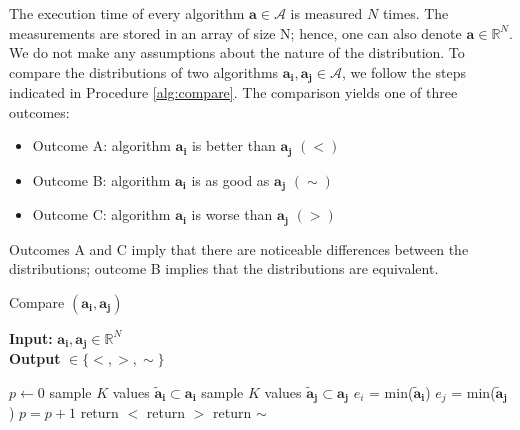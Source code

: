 \documentclass[conference]{IEEEtran}
\newcommand{\p}[1]{{\color{blue} Pdj: #1}}
\begin{document}
The execution time of every algorithm $\mathbf{a} \in \mathcal{A}$ is
measured $N$ times. The measurements are stored in an array of size N; hence, one can also denote
$\mathbf{a} \in \mathbb{R}^N$. We do not make any assumptions about the nature of the distribution. To compare the
distributions of two algorithms $\mathbf{a_i},\mathbf{a_j} \in \mathcal{A}$, we follow the steps indicated in Procedure
\ref{alg:compare}.
%
The comparison yields one of three outcomes:
\begin{itemize}
\item Outcome A: algorithm $\mathbf{a_i}$ is better than $\mathbf{a_j}$ $(<)$
\item Outcome B: algorithm  $\mathbf{a_i}$ is as good as $\mathbf{a_j}$ $(\sim)$
\item Outcome C: algorithm  $\mathbf{a_i}$ is worse than $\mathbf{a_j}$ $(>)$
\end{itemize}
Outcomes A and C imply that there are noticeable differences between the distributions; outcome B implies that the distributions are equivalent.
\begin{algorithm}
	\caption{Compare $(\mathbf{a_i}, \mathbf{a_j})$ }
	\label{alg:compare}
	\hspace*{\algorithmicindent} \textbf{Input: } $ \mathbf{a_i}, \mathbf{a_j} \in \mathbb{R}^{N}$ \\
	\hspace*{\algorithmicindent} \textbf{Output } $\in  \{<,>,\sim \}$
	\begin{algorithmic}[1] 
		\State $p \leftarrow 0$
		\State sample $K$ values $\mathbf{\tilde{a}_i} \subset \mathbf{a_i}$
		\State sample $K$ values $\mathbf{\tilde{a}_j} \subset \mathbf{a_j}$
		\State $e_i$ = min($\mathbf{\tilde{a}_i}$)
		\State $e_j$ = min($\mathbf{\tilde{a}_j}$)
		\State $p=p+1$
		\EndIf
		\EndFor
		\State return $<$ 
		\State return $>$ 
		\Else
		\State return $\sim$ 
		\EndIf
	\end{algorithmic}
      \end{algorithm}
\end{document}
